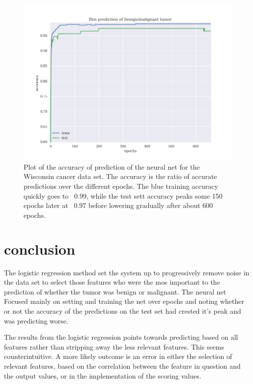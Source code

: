 \documentclass[10pt]{article}
\begin{document}
\begin{figure}[hbtp]
\includegraphics[scale=.6]{../ffnnaccuracy.png}
\caption{Plot of the accuracy of prediction of the neural net for the Wisconsin
	cancer data set.  The accuracy is the ratio of accurate predictions over
	the different epochs. The blue training accuracy quickly goes to ~0.99,
	while the test sett accuracy peaks some 150 epochs later at ~0.97 before
	lowering gradually after about 600 epochs.}
\label{fig:ffnnaccuracy}
\end{figure}


\section{conclusion}

The logistic regression method set the system up to progressively remove noise in 
the data set to select those features who were the mos important to the prediction
of whether the tumor was benign or malignant. The neural net Focused mainly on setting
and training the net over epochs and noting whether or not the accuracy of the predictions
on the test set had crested it's peak and was predicting worse. 

The results from the logistic regression points towards predicting based on all
features rather than stripping away the less relevant features. This seems
counterintuitive. A more likely outcome is an error in either the selection of
relevant features, based on the correlation between the feature in question and
the output values, or in the implementation of the scoring values. 
\end{document}
